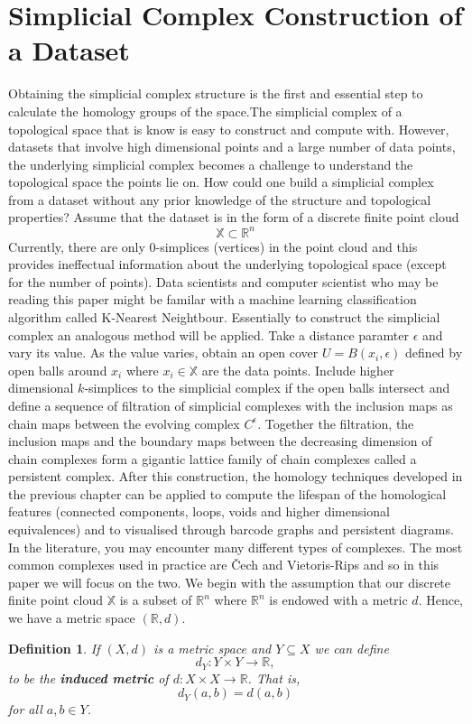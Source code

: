 \documentclass{article}
\newcommand{\be}{\begin{equation}}
\newcommand{\ee}{\end{equation}}
\newtheorem{definition}[theorem]{Definition}
\begin{document}
\section{Simplicial Complex Construction of a Dataset}
Obtaining the simplicial complex structure is the first and essential step to calculate the homology groups of the space.The simplicial complex of a topological space that is know is easy to construct and compute with. However, datasets that involve high dimensional points and a large number of data points, the underlying simplicial complex becomes a challenge to understand the topological space the points lie on. How could one build a simplicial complex from a dataset without any prior knowledge of the structure and topological properties? Assume that the dataset is in the form of a discrete finite point cloud
\be
\mathbb{X} \subset \mathbb{R}^n
\ee
Currently, there are only $0$-simplices (vertices) in the point cloud and this provides ineffectual information about the underlying topological space (except for the number of points). Data scientists and computer scientist who may be reading this paper might be familar with a machine learning classification algorithm called K-Nearest Neightbour. Essentially to construct the simplicial complex an analogous method will be applied. Take a distance paramter $\epsilon $ and vary its value. As the value varies, obtain an open cover $U = B(x_i,\epsilon)$ defined by open balls around $x_i$ where $x_i \in \mathbb{X}$ are the data points. Include higher dimensional $k$-simplices to the simplicial complex if the open balls intersect and define a sequence of filtration of simplicial complexes with the inclusion maps as chain maps between the evolving complex $C^{\epsilon}$. Together the filtration, the inclusion maps and the boundary maps between the decreasing dimension of chain complexes form a gigantic lattice family of chain complexes called a persistent complex. After this construction, the homology techniques developed in the previous chapter can be applied to compute the lifespan of the homological features (connected components, loops, voids and higher dimensional equivalences) and to visualised through barcode graphs and persistent diagrams.
In the literature, you may encounter many different types of complexes. The most common complexes used in practice are \v{C}ech and Vietoris-Rips and so in this paper we will focus on the two. 
We begin with the assumption that our discrete finite point cloud $\mathbb{X}$ is a subset of $\mathbb{R}^n$ where $\mathbb{R}^n$ is endowed with a metric $d$. Hence, we have a metric space $(\mathbb{R},d)$.
\begin{definition}If $(X,d)$ is a metric space and $Y \subseteq X$ we can define \be
d_Y : Y \times Y \to \mathbb{R},
\ee
to be the \textbf{induced metric} of $d: X \times X \to \mathbb{R}$. That is,
\be
d_Y(a,b) = d(a,b) 
\ee
for all $a,b \in Y$.
\end{definition}
\end{document}
